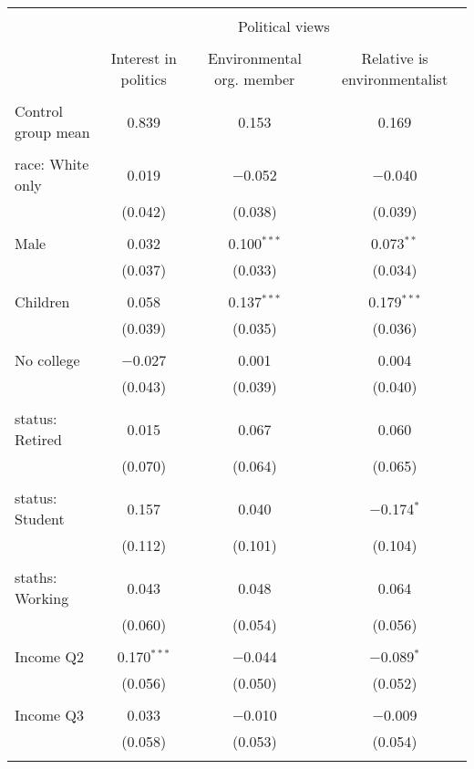 
\begin{tabular}{@{\extracolsep{5pt}}lccc} 
\\[-1.8ex]\hline 
\hline \\[-1.8ex] 
 & \multicolumn{3}{c}{Political views} \\ 
\cline{2-4} 
\\[-1.8ex] & Interest in politics & Environmental org. member & Relative is environmentalist \\ 
\hline \\[-1.8ex] 
 Control group mean & 0.839 & 0.153 & 0.169  \\ \hline \\[-1.8ex] race: White only & 0.019 & $-$0.052 & $-$0.040 \\ 
  & (0.042) & (0.038) & (0.039) \\ 
  & & & \\ 
 Male & 0.032 & 0.100$^{***}$ & 0.073$^{**}$ \\ 
  & (0.037) & (0.033) & (0.034) \\ 
  & & & \\ 
 Children & 0.058 & 0.137$^{***}$ & 0.179$^{***}$ \\ 
  & (0.039) & (0.035) & (0.036) \\ 
  & & & \\ 
 No college & $-$0.027 & 0.001 & 0.004 \\ 
  & (0.043) & (0.039) & (0.040) \\ 
  & & & \\ 
 status: Retired & 0.015 & 0.067 & 0.060 \\ 
  & (0.070) & (0.064) & (0.065) \\ 
  & & & \\ 
 status: Student & 0.157 & 0.040 & $-$0.174$^{*}$ \\ 
  & (0.112) & (0.101) & (0.104) \\ 
  & & & \\ 
 staths: Working & 0.043 & 0.048 & 0.064 \\ 
  & (0.060) & (0.054) & (0.056) \\ 
  & & & \\ 
 Income Q2 & 0.170$^{***}$ & $-$0.044 & $-$0.089$^{*}$ \\ 
  & (0.056) & (0.050) & (0.052) \\ 
  & & & \\ 
 Income Q3 & 0.033 & $-$0.010 & $-$0.009 \\ 
  & (0.058) & (0.053) & (0.054) \\ 
  & & & \\ 

\end{tabular}
